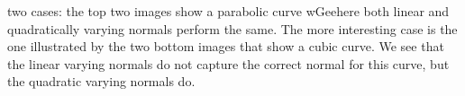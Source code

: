 	two cases: the top two images show a parabolic curve wGeehere both linear and quadratically varying normals perform the same. The more interesting case is the one illustrated by the two bottom images that show a cubic curve. We see that the linear varying normals do not capture the correct normal for this curve, but the quadratic varying normals do.



